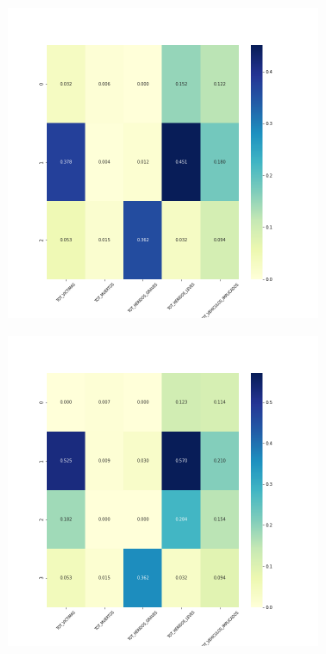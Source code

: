 \begin{figure}[H]
\begin{subfigure}{.5\textwidth}
  \centering
  \includegraphics[width=0.9\textwidth]{imagenes/case1/kmeans/heatmaps/hm_kmeans_case1_entrada_k3.png}
\end{subfigure}%
\begin{subfigure}{.5\textwidth}
  \centering
  \includegraphics[width=0.9\textwidth]{imagenes/case1/kmeans/heatmaps/hm_kmeans_case1_entrada_k4.png}

\end{subfigure}
\end{figure}
